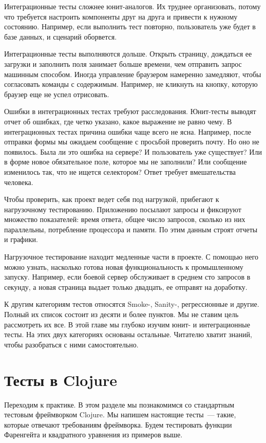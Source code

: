 Интеграционные тесты сложнее юнит-аналогов. Их труднее организовать, потому что
требуется настроить компоненты друг на друга и привести к нужному
состоянию. Например, если выполнить тест повторно, пользователь уже будет в базе
данных, и сценарий оборвется.

Интеграционные тесты выполняются дольше. Открыть страницу, дождаться ее загрузки
и заполнить поля занимает больше времени, чем отправить запрос машинным
способом. Иногда управление браузером намеренно замедляют, чтобы согласовать
команды с содержимым. Например, не кликнуть на кнопку, которую браузер еще не
успел отрисовать.

Ошибки в интеграционных тестах требуют расследования. Юнит-тесты выводят отчет
об ошибках, где четко указано, какое выражение не равно чему. В интеграционных
тестах причина ошибки чаще всего не ясна. Например, после отправки формы мы
ожидаем сообщение с просьбой проверить почту. Но оно не появилось. Была ли это
ошибка на сервере? И пользователь уже существует? Или в форме новое обязательное
поле, которое мы не заполнили? Или сообщение изменилось так, что не ищется
селектором? Ответ требует вмешательства человека.

Чтобы проверить, как проект ведет себя под нагрузкой, прибегают к нагрузочному
тестированию. Приложению посылают запросы и фиксируют множество показателей:
время ответа, общее число запросов, сколько из них параллельны, потребление
процессора и памяти. По этим данным строят отчеты и графики.

Нагрузочное тестирование находит медленные части в проекте. С помощью него можно
узнать, насколько готова новая функциональность к промышленному
запуску. Например, если боевой сервер обслуживает в среднем сто запросов в
секунду, а новая страница выдает только двадцать, ее отправят на доработку.

К другим категориям тестов относятся Smoke-, Sanity-, регрессионные и
другие. Полный их список состоит из десяти и более пунктов. Мы не ставим цель
рассмотреть их все. В этой главе мы глубоко изучим юнит- и интеграционные
тесты. На этих двух категориях основаны остальные. Читателю хватит знаний, чтобы
разобраться с ними самостоятельно.

\section{Тесты в Clojure}

Переходим к практике. В этом разделе мы познакомимся со стандартным тестовым
фреймворком Clojure. Мы напишем настоящие тесты~--- такие, которые отвечают
требованиям фреймворка. Будем тестировать функции Фаренгейта и квадратного
уравнения из примеров выше.

